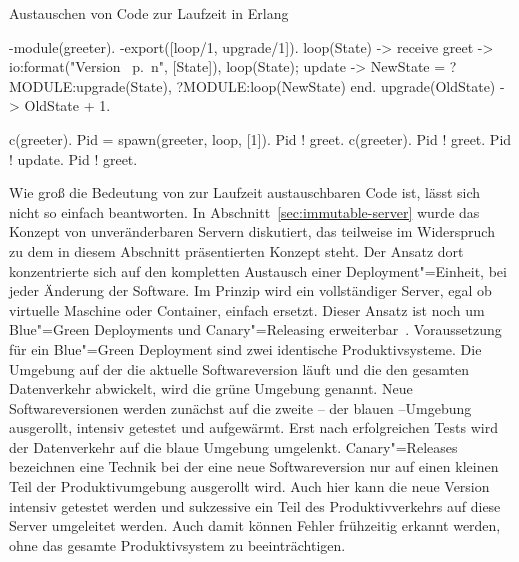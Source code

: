 \begin{program}[!hbt]
\caption{Austauschen von Code zur Laufzeit in Erlang}
\label{prog:erlang-hot-code-loading}
\noindent\begin{minipage}[t]{.49\textwidth}
\lstset{showlines=true}
\begin{ErlangCode}
-module(greeter).
-export([loop/1, upgrade/1]).
loop(State) -> receive
  greet -> 
    io:format("Version ~p.~n",
						  [State]),
    loop(State);
  update ->
    NewState = 
			?MODULE:upgrade(State),
    ?MODULE:loop(NewState)
end.
upgrade(OldState) -> 
  OldState + 1.
\end{ErlangCode}

\end{minipage}\hfill
\begin{minipage}[t]{.48\textwidth}
\lstset{showlines=true}
\begin{ErlangCode}
c(greeter).
Pid = spawn(greeter, loop, [1]).
Pid ! greet. %
c(greeter).
Pid ! greet. %
Pid ! update.
Pid ! greet. %






\end{ErlangCode}

\end{minipage}
\end{program}

Wie groß die Bedeutung von zur Laufzeit austauschbaren Code ist, lässt sich nicht so einfach beantworten. In Abschnitt~\ref{sec:immutable-server} wurde das Konzept von unveränderbaren Servern diskutiert, das teilweise im Widerspruch zu dem in diesem Abschnitt präsentierten Konzept steht. Der Ansatz dort konzentrierte sich auf den kompletten Austausch einer Deployment"=Einheit, bei jeder Änderung der Software. Im Prinzip wird ein vollständiger Server, egal ob virtuelle Maschine oder Container, einfach ersetzt. Dieser Ansatz ist noch um Blue"=Green Deployments und Canary"=Releasing erweiterbar~\cite[261-265]{Humble:2010:CDR:1869904}. Voraussetzung für ein Blue"=Green Deployment sind zwei identische Produktivsysteme. Die Umgebung auf der die aktuelle Softwareversion läuft und die den gesamten Datenverkehr abwickelt, wird die grüne Umgebung genannt. Neue Softwareversionen werden zunächst auf die zweite -- der blauen --Umgebung ausgerollt, intensiv getestet und aufgewärmt. Erst nach erfolgreichen Tests wird der Datenverkehr auf die blaue Umgebung umgelenkt. Canary"=Releases bezeichnen eine Technik bei der eine neue Softwareversion nur auf einen kleinen Teil der Produktivumgebung ausgerollt wird. Auch hier kann die neue Version intensiv getestet werden und sukzessive ein Teil des Produktivverkehrs auf diese Server umgeleitet werden. Auch damit können Fehler frühzeitig erkannt werden, ohne das gesamte Produktivsystem zu beeinträchtigen.

